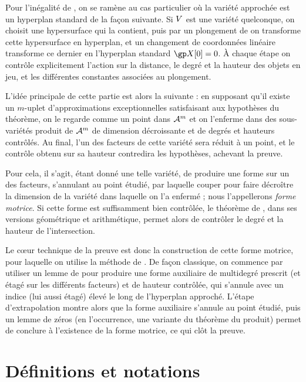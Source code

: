 \medskip

Pour l'inégalité de , on se ramène au cas particulier où la variété
approchée est un hyperplan standard de la façon suivante. Si \( V \) est
une variété quelconque, on choisit une hypersurface qui la contient, puis par
un plongement de  on transforme cette hypersurface en hyperplan,
et un changement de coordonnées linéaire transforme ce dernier en l'hyperplan
standard \( \vp[0] = 0 \). À chaque étape on contrôle explicitement l'action
sur la distance, le degré et la hauteur des objets en jeu, et les différentes
constantes associées au plongement.

L'idée principale de cette partie est alors la suivante : en supposant qu'il
existe un \( m \)-uplet d'approximations exceptionnelles satisfaisant aux
hypothèses du théorème, on le regarde comme un point dans \( \mathcal A^m \) et on
l'enferme dans des sous-variétés produit de \( \mathcal A^m \) de dimension
décroissante et de degrés et hauteurs contrôlés. Au final, l'un des facteurs
de cette variété sera réduit à un point, et le contrôle obtenu sur sa hauteur
contredira les hypothèses, achevant la preuve.

Pour cela, il s'agit, étant donné une telle variété, de produire une forme sur
un des facteurs, s'annulant au point étudié, par laquelle couper pour faire
décroître la dimension de la variété dans laquelle on l'a enfermé ; nous
l'appellerons \emph{forme motrice}. Si cette forme est suffisamment bien
contrôlée, le théorème de , dans ses versions géométrique et
arithmétique, permet alors de contrôler le degré et la hauteur de
l'intersection.

Le cœur technique de la preuve est donc la construction de cette forme
motrice, pour laquelle on utilise la méthode de . De façon
classique, on commence par utiliser un lemme de  pour produire une
forme auxiliaire de multidegré prescrit (et étagé sur les différents facteurs)
et de hauteur contrôlée, qui s'annule avec un indice (lui aussi étagé) élevé le
long de l'hyperplan approché. L'étape d'extrapolation montre alors que la
forme auxiliaire s'annule au point étudié, puis un lemme de zéros (en
l'occurrence, une variante du théorème du produit) permet de conclure à
l'existence de la forme motrice, ce qui clôt la preuve.



\section{Définitions et notations}

